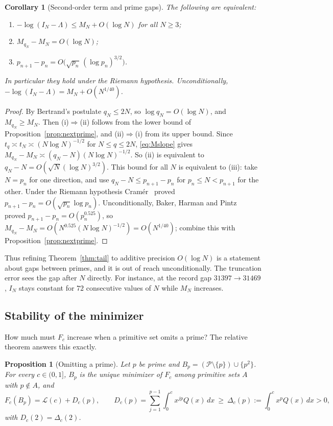 \documentclass[11pt]{article}
\newtheorem{proposition}[theorem]{Proposition}
\newtheorem{corollary}[theorem]{Corollary}
\theoremstyle{remark}
\newcommand{\Prm}{\mathcal{P}}
\begin{document}
\begin{corollary}[Second-order term and prime gaps]\label{cor:gaps}
The following are equivalent:
\begin{enumerate}
\item[(i)] $-\log(I_N-\Lambda)\le M_N+O(\log N)$ for all $N\ge3$;
\item[(ii)] $M_{q_N}-M_N=O(\log N)$;
\item[(iii)] $p_{n+1}-p_n=O\bigl(\sqrt{p_n}\,(\log p_n)^{3/2}\bigr)$.
\end{enumerate}
In particular they hold under the Riemann hypothesis. Unconditionally,
$-\log(I_N-\Lambda)=M_N+O(N^{1/40})$.
\end{corollary}

\begin{proof}
By Bertrand's postulate $q_N\le2N$, so $\log q_N=O(\log N)$, and
$M_{q_N}\ge M_N$. Then (i)$\Rightarrow$(ii) follows from the lower bound
of Proposition~\ref{prop:nextprime}, and (ii)$\Rightarrow$(i) from its
upper bound. Since $t_q\asymp t_N\asymp(N\log N)^{-1/2}$ for
$N\le q\le2N$, \eqref{eq:Mslope} gives
$M_{q_N}-M_N\asymp(q_N-N)(N\log N)^{-1/2}$. So (ii) is equivalent to
$q_N-N=O(\sqrt N(\log N)^{3/2})$. This bound for all $N$ is equivalent
to (iii): take $N=p_n$ for one direction, and use $q_N-N\le p_{n+1}-p_n$
for $p_n\le N<p_{n+1}$ for the other. Under the Riemann hypothesis
Cram\'er~\cite{Cramer1920} proved $p_{n+1}-p_n=O(\sqrt{p_n}\log p_n)$.
Unconditionally, Baker, Harman and Pintz~\cite{BHP2001} proved
$p_{n+1}-p_n=O(p_n^{0.525})$, so
$M_{q_N}-M_N=O(N^{0.525}(N\log N)^{-1/2})=O(N^{1/40})$; combine this with
Proposition~\ref{prop:nextprime}.
\end{proof}

Thus refining Theorem~\ref{thm:tail} to additive precision $O(\log N)$
is a statement about gaps between primes, and it is out of reach
unconditionally. The truncation error sees the gap after $N$ directly.
For instance, at the record gap $31397\to31469$, $I_N$ stays constant
for $72$ consecutive values of $N$ while $M_N$ increases.

\subsection{Stability of the minimizer}\label{sec:stability}
How much must $F_c$ increase when a primitive set omits a prime? The
relative theorem answers this exactly.

\begin{proposition}[Omitting a prime]\label{prop:omit}
Let $p$ be prime and $B_p=(\Prm\setminus\{p\})\cup\{p^2\}$. For every
$c\in(0,1]$, $B_p$ is the unique minimizer of $F_c$ among primitive sets
$A$ with $p\notin A$, and
\[
  F_c(B_p)=\mathcal L(c)+D_c(p),\qquad
  D_c(p)=\sum_{j=1}^{p-1}\int_0^cx^{jp}Q(x)\,dx\ \ge\
  \Delta_c(p):=\int_0^cx^pQ(x)\,dx>0,
\]
with $D_c(2)=\Delta_c(2)$.
\end{proposition}
\end{document}
